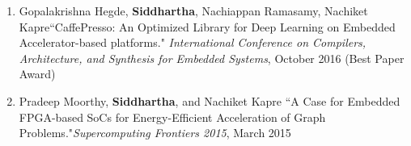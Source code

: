\documentclass[10pt]{article}
\begin{document}
{\begin{adjustwidth}{-1.25in}{}
\begin{enumerate}
            \item Gopalakrishna Hegde, \textbf{Siddhartha}, Nachiappan Ramasamy, Nachiket Kapre\newline``CaffePresso: An Optimized Library for Deep Learning on Embedded Accelerator-based platforms." \emph{International Conference on Compilers, Architecture, and Synthesis for Embedded Systems}, October 2016 (Best Paper Award)
            \item Pradeep Moorthy, {\bf Siddhartha}, and Nachiket Kapre ``A Case for Embedded FPGA-based SoCs for Energy-Efficient Acceleration of Graph Problems."\newline\emph{Supercomputing Frontiers 2015}, March 2015
        \end{enumerate}


\end{adjustwidth}}
\end{document}

